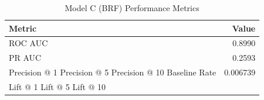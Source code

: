 \begin{table}[h]
\centering
\begin{tabular}{lr}
\toprule
Metric & Value \\
\midrule
ROC AUC & 0.8990 \\
PR AUC & 0.2593 \\
Precision @ 1%
Precision @ 5%
Precision @ 10%
Baseline Rate & 0.006739 \\
Lift @ 1%
Lift @ 5%
Lift @ 10%
\bottomrule
\end{tabular}
\caption{Model C (BRF) Performance Metrics}
\label{tab:modelc_brf_metrics}
\end{table}
